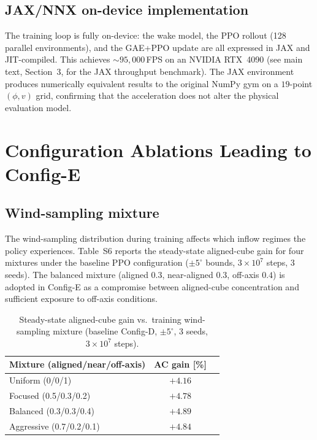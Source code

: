 \documentclass{article}
\begin{document}
\subsection{JAX/NNX on-device implementation}

The training loop is fully on-device: the wake model, the PPO rollout (128 parallel environments), and the GAE+PPO update are all expressed in JAX and JIT-compiled. This achieves ${\sim}95{,}000$\,FPS on an NVIDIA RTX~4090 (see main text, Section~3, for the JAX throughput benchmark). The JAX environment produces numerically equivalent results to the original NumPy gym on a $19$-point $(\phi,v)$ grid, confirming that the acceleration does not alter the physical evaluation model.

\section{Configuration Ablations Leading to Config-E}\label{sec:config_abl}

\subsection{Wind-sampling mixture}

The wind-sampling distribution during training affects which inflow regimes the policy experiences. Table~S6 reports the steady-state aligned-cube gain for four mixtures under the baseline PPO configuration (${\pm}5^\circ$ bounds, $3{\times}10^{7}$ steps, 3 seeds). The balanced mixture (aligned $0.3$, near-aligned $0.3$, off-axis $0.4$) is adopted in Config-E as a compromise between aligned-cube concentration and sufficient exposure to off-axis conditions.

\begin{table}[h]
\centering
\caption{Steady-state aligned-cube gain vs.\ training wind-sampling mixture (baseline Config-D, ${\pm}5^\circ$, 3 seeds, $3{\times}10^{7}$ steps).}
\label{tab:mix_sens}
\small
\begin{tabular}{lcc}
\toprule
Mixture (aligned/near/off-axis) & AC gain [\%] \\
\midrule
Uniform (0/0/1)   & $+4.16$ \\
Focused (0.5/0.3/0.2) & $+4.78$ \\
Balanced (0.3/0.3/0.4) & $+4.89$ \\
Aggressive (0.7/0.2/0.1) & $+4.84$ \\
\bottomrule
\end{tabular}
\end{table}
\end{document}
